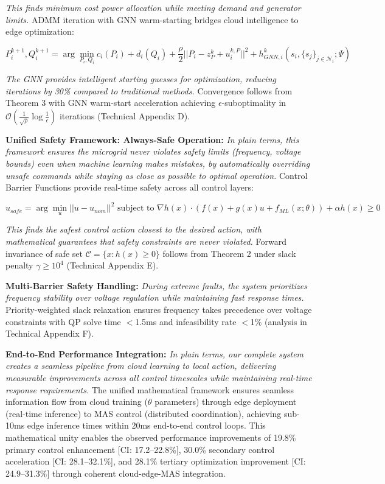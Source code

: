 \documentclass[12pt]{article}
\begin{document}
\textit{This finds minimum cost power allocation while meeting demand and generator limits.} ADMM iteration with GNN warm-starting bridges cloud intelligence to edge optimization:

$$P_i^{k+1}, Q_i^{k+1} = \arg\min_{P_i,Q_i} c_i(P_i) + d_i(Q_i) + \frac{\rho}{2}||P_i - z_P^k + u_i^{k,P}||^2 + h_{GNN,i}^k(s_i, \{s_j\}_{j \in \mathcal{N}_i}; \Psi)$$

\textit{The GNN provides intelligent starting guesses for optimization, reducing iterations by 30\% compared to traditional methods.} Convergence follows from Theorem 3 with GNN warm-start acceleration achieving $\epsilon$-suboptimality in $\mathcal{O}(\frac{1}{\sqrt{\rho}} \log\frac{1}{\epsilon})$ iterations (Technical Appendix D).

\textbf{Unified Safety Framework: Always-Safe Operation:} \textit{In plain terms, this framework ensures the microgrid never violates safety limits (frequency, voltage bounds) even when machine learning makes mistakes, by automatically overriding unsafe commands while staying as close as possible to optimal operation.} Control Barrier Functions \cite{ames2017} provide real-time safety across all control layers:

$$u_{safe} = \arg\min_u ||u - u_{nom}||^2 \text{ subject to } \nabla h(x) \cdot (f(x) + g(x)u + f_{ML}(x; \theta)) + \alpha h(x) \geq 0$$

\textit{This finds the safest control action closest to the desired action, with mathematical guarantees that safety constraints are never violated.} Forward invariance of safe set $\mathcal{C} = \{x : h(x) \geq 0\}$ follows from Theorem 2 under slack penalty $\gamma \geq 10^4$ (Technical Appendix E).

\textbf{Multi-Barrier Safety Handling:} \textit{During extreme faults, the system prioritizes frequency stability over voltage regulation while maintaining fast response times.} Priority-weighted slack relaxation ensures frequency takes precedence over voltage constraints with QP solve time $<$1.5ms and infeasibility rate $<$1\% (analysis in Technical Appendix F).

\textbf{End-to-End Performance Integration:} \textit{In plain terms, our complete system creates a seamless pipeline from cloud learning to local action, delivering measurable improvements across all control timescales while maintaining real-time response requirements.} The unified mathematical framework ensures seamless information flow from cloud training ($\theta$ parameters) through edge deployment (real-time inference) to MAS control (distributed coordination), achieving sub-10ms edge inference times within 20ms end-to-end control loops. This mathematical unity enables the observed performance improvements of 19.8\% primary control enhancement [CI: 17.2--22.8\%], 30.0\% secondary control acceleration [CI: 28.1--32.1\%], and 28.1\% tertiary optimization improvement [CI: 24.9--31.3\%] through coherent cloud-edge-MAS integration.
\end{document}
